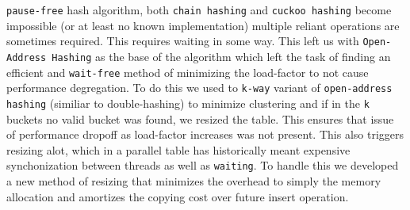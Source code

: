 \texttt{pause-free} hash algorithm, both \texttt{chain hashing} and
\texttt{cuckoo hashing} become impossible (or at least no known
implementation) multiple reliant operations are sometimes
required. This requires waiting in some way. This left us with
\texttt{Open-Address Hashing} as the base of the algorithm which left
the task of finding an efficient and \texttt{wait-free} method of
minimizing the load-factor to not cause performance degregation. To do
this we used to \texttt{k-way} variant of \texttt{open-address
  hashing} (similiar to double-hashing) to minimize clustering and if
in the \texttt{k} buckets no valid bucket was found, we resized the
table. This ensures that issue of performance dropoff as load-factor
increases was not present. This also triggers resizing alot, which in
a parallel table has historically meant expensive synchonization
between threads as well as \texttt{waiting}. To handle this we
developed a new method of resizing that minimizes the overhead to
simply the memory allocation and amortizes the copying cost over
future insert operation.

